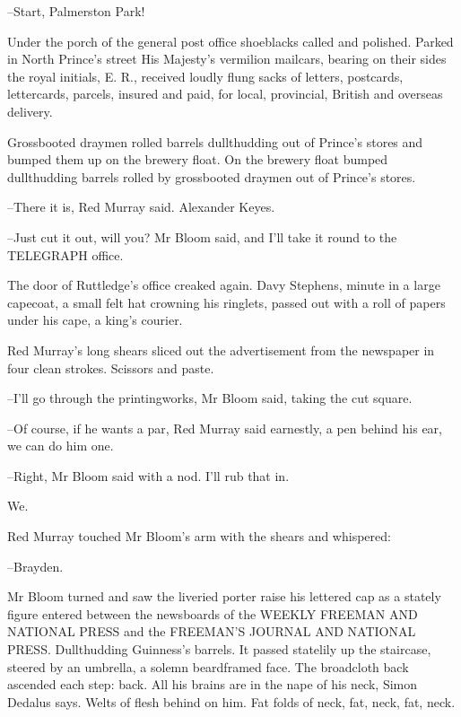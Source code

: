 --Start, Palmerston Park!



Under the porch of the general post office shoeblacks called and
polished. Parked in North Prince's street His Majesty's vermilion
mailcars, bearing on their sides the royal initials, E. R., received
loudly flung sacks of letters, postcards, lettercards, parcels, insured
and paid, for local, provincial, British and overseas delivery.



Grossbooted draymen rolled barrels dullthudding out of Prince's
stores and bumped them up on the brewery float. On the brewery float
bumped dullthudding barrels rolled by grossbooted draymen out of
Prince's stores.

--There it is, Red Murray said. Alexander Keyes.

--Just cut it out, will you? Mr Bloom said, and I'll take it round to the
TELEGRAPH office.

The door of Ruttledge's office creaked again. Davy Stephens, minute
in a large capecoat, a small felt hat crowning his ringlets, passed out
with a roll of papers under his cape, a king's courier.

Red Murray's long shears sliced out the advertisement from the
newspaper in four clean strokes. Scissors and paste.

--I'll go through the printingworks, Mr Bloom said, taking the cut square.

--Of course, if he wants a par, Red Murray said earnestly, a pen behind
his ear, we can do him one.

--Right, Mr Bloom said with a nod. I'll rub that in.

We.



Red Murray touched Mr Bloom's arm with the shears and whispered:

--Brayden.

Mr Bloom turned and saw the liveried porter raise his lettered cap as a
stately figure entered between the newsboards of the WEEKLY FREEMAN AND
NATIONAL PRESS and the FREEMAN'S JOURNAL AND NATIONAL PRESS. Dullthudding
Guinness's barrels. It passed statelily up the staircase, steered by an
umbrella, a solemn beardframed face. The broadcloth back ascended each
step: back. All his brains are in the nape of his neck, Simon Dedalus
says. Welts of flesh behind on him. Fat folds of neck, fat, neck, fat,
neck.

